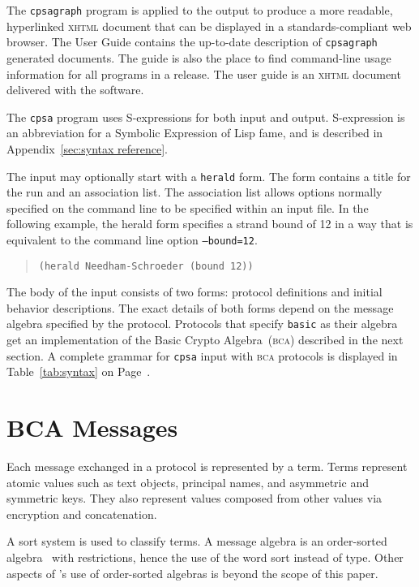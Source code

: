 \documentclass[12pt]{article}
\begin{document}
The \texttt{cpsagraph} program is applied to the output to produce a
more readable, hyperlinked \textsc{xhtml} document that can be displayed
in a standards-compliant web browser.  The {\cpsa} User Guide contains
the up-to-date description of \texttt{cpsagraph} generated documents.
The guide is also the place to find command-line usage information for
all programs in a release.  The user guide is an \textsc{xhtml}
document delivered with the software.

The \texttt{cpsa} program uses S-expressions for both input and
output.  S-expression is an abbreviation for a Symbolic Expression of
Lisp fame, and is described in Appendix~\ref{sec:syntax reference}.

The input may optionally start with a \texttt{herald} form.  The form contains a title for the run
and an association list.  The association list allows options normally
specified on the command line to be specified within an input file.
In the following example, the herald form specifies a strand bound of
12 in a way that is equivalent to the command line option
\texttt{--bound=12}.

\begin{quote}
\begin{verbatim}
(herald Needham-Schroeder (bound 12))
\end{verbatim}
\end{quote}

The body of the input consists of two forms: protocol definitions and
initial behavior descriptions.  The exact details of both forms depend
on the message algebra specified by the protocol.  Protocols that
specify \texttt{basic} as their algebra get an implementation of the
Basic Crypto Algebra~(\textsc{bca}) described in the next section.  A
complete grammar for \texttt{cpsa} input with \textsc{bca} protocols
is displayed in Table~\ref{tab:syntax} on Page~\pageref{tab:syntax}.

\section{BCA Messages}

Each message exchanged in a protocol is represented by a term.  Terms
represent atomic values such as text objects, principal names, and
asymmetric and symmetric keys.  They also represent values composed
from other values via encryption and concatenation.

A sort system is used to classify terms. A {\cpsa} message algebra is
an order-sorted algebra~\cite{GoguenMeseguer92} with restrictions,
hence the use of the word sort instead of type.  Other aspects of
{\cpsa}'s use of order-sorted algebras is beyond the scope of this
paper.
\end{document}
